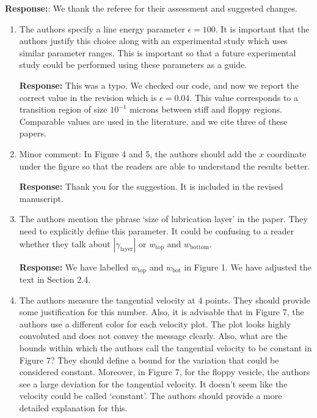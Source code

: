 \documentclass[11pt]{article}
\begin{document}
\noindent
{\bf Response:}: We thank the referee for their assessment and suggested
changes.

\begin{enumerate}
\item The authors specify a line energy parameter $\epsilon = 100$. It
  is important that the authors justify this choice along with an
    experimental study which uses similar parameter ranges. This is
    important so that a future experimental study could be performed
    using these parameters as a guide.

\noindent
{\bf Response:} This was a typo. We checked our code, and now we
report the correct value in the revision which is $\epsilon = 0.04$.
This value corresponds to a transition region of size $10^{-1}$ microns
between stiff and floppy regions. Comparable values are used in the
literature, and we cite three of these papers.

\item Minor comment: In Figure 4 and 5, the authors should add the $x$
  coordinate under the figure so that the readers are able to understand
    the results better.

\noindent
{\bf Response:} Thank you for the suggestion. It is included in the
    revised manuscript.

\item The authors mention the phrase `size of lubrication layer' in the
  paper. They need to explicitly define this parameter. It could be
    confusing to a reader whether they talk about
    $|\gamma_{\mathrm{layer}}|$ or $w_{\mathrm{top}}$ and
    $w_{\mathrm{bottom}}$.

\noindent
    {\bf Response:} We have labelled $w_{\mathrm{top}}$ and
    $w_{\mathrm{bot}}$ in Figure 1. We have adjusted the text in Section
    2.4.

\item The authors measure the tangential velocity at 4 points. They
  should provide some justification for this number. Also, it is
    advisable that in Figure 7, the authors use a different color for
    each velocity plot. The plot looks highly convoluted and does not
    convey the message clearly. Also, what are the bounds within which
    the authors call the tangential velocity to be constant in Figure 7?
    They should define a bound for the variation that could be
    considered constant. Moreover, in Figure 7, for the floppy vesicle,
    the authors see a large deviation for the tangential velocity. It
    doesn't seem like the velocity could be called `constant'. The
    authors should provide a more detailed explanation for this.


\end{enumerate}
\end{document}
